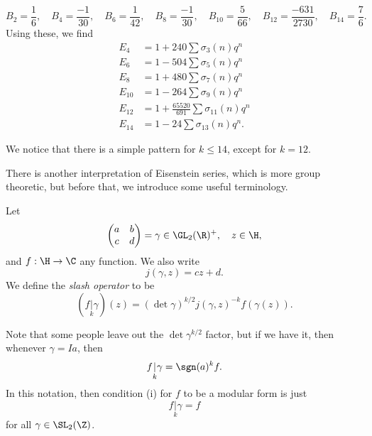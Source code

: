 \documentclass[a4paper]{article}
\begin{document}
\begin{eg}
  \[
    B_2 = \frac{1}{6},\quad B_4 = \frac{-1}{30},\quad B_6 = \frac{1}{42},\quad B_8 = \frac{-1}{30},\quad B_{10} = \frac{5}{66}, \quad B_{12} = \frac{-631}{2730},\quad B_{14} = \frac{7}{6}.
  \]
  Using these, we find
  \begin{align*}
    E_4 &= 1 + 240 \sum \sigma_3(n) q^n\\
    E_6 &= 1 - 504 \sum \sigma_5 (n) q^n\\
    E_8 &= 1 + 480 \sum \sigma_7(n) q^n\\
    E_{10} &= 1 - 264 \sum \sigma_9(n) q^n\\
    E_{12} &= 1 + \frac{65520}{691} \sum \sigma_{11}(n) q^n\\
    E_{14} &= 1 - 24 \sum \sigma_{13}(n) q^n.
  \end{align*}
\end{eg}
We notice that there is a simple pattern for $k \leq 14$, except for $k = 12$.

There is another interpretation of Eisenstein series, which is more group theoretic, but before that, we introduce some useful terminology.

\begin{defi}
  Let
  \[
    \begin{pmatrix}
      a & b\\
      c & d
    \end{pmatrix} = \gamma \in \GL_2(\R)^+,\quad z \in \H,
  \]
  and $f: \H \to \C$ any function. We also write
  \[
    j(\gamma, z) = cz + d.
  \]
  We define the \emph{slash operator} to be
  \[
    (f\underset{k}{|} \gamma) (z) = (\det \gamma)^{k/2} j(\gamma, z)^{-k} f(\gamma(z)).
  \]
\end{defi}
Note that some people leave out the $\det \gamma^{k/2}$ factor, but if we have it, then whenever $\gamma = Ia$, then
\[
  f\underset{k}{|} \gamma = \sgn(a)^k f.
\]
In this notation, then condition (i) for $f$ to be a modular form is just
\[
  f\underset{k}{|}\gamma = f
\]
for all $\gamma \in \SL_2(\Z)$.
\end{document}
